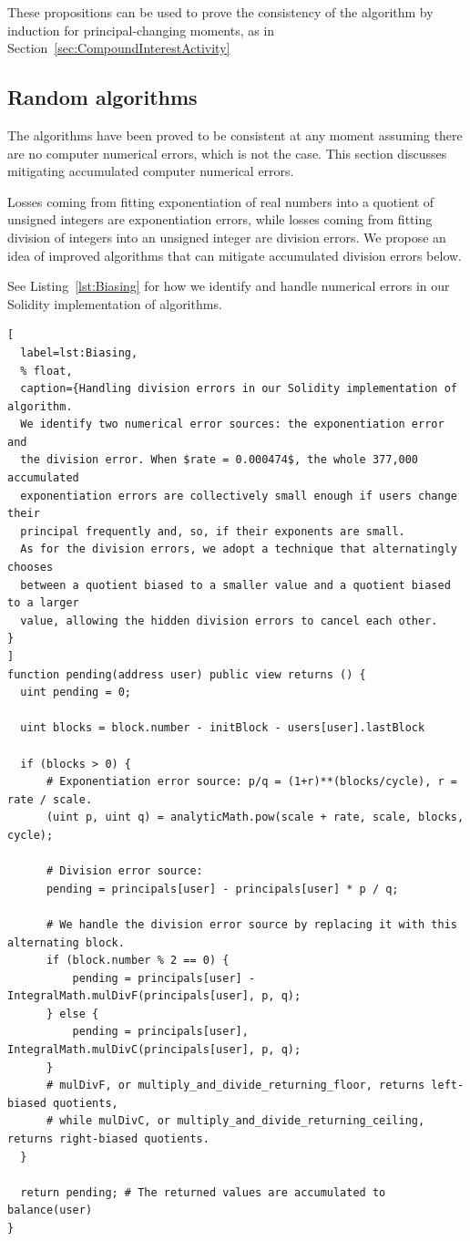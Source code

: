 \documentclass{article}
\begin{document}
These propositions can be used to prove the consistency of the algorithm by induction for 
principal-changing moments, as in Section~\ref{sec:CompoundInterestActivity}


\subsection{Random algorithms}
\label{sec:RandomAlgorithms}

The algorithms have been proved to be consistent at any moment assuming there are 
no computer numerical errors, which is not the case.
This section discusses mitigating accumulated computer numerical errors.

Losses coming from fitting exponentiation 
of real numbers into a quotient of unsigned integers are exponentiation errors, 
while losses coming from fitting division of integers into 
an unsigned integer are division errors.
We propose an idea of improved algorithms that can 
mitigate accumulated division errors below.

See Listing~\ref{lst:Biasing} for how we identify and handle numerical errors 
in our Solidity implementation of algorithms.
\newline

\begin{lstlisting}[
  label=lst:Biasing,
  % float,
  caption={Handling division errors in our Solidity implementation of algorithm. 
  We identify two numerical error sources: the exponentiation error and 
  the division error. When $rate = 0.000474$, the whole 377,000 accumulated 
  exponentiation errors are collectively small enough if users change their 
  principal frequently and, so, if their exponents are small.
  As for the division errors, we adopt a technique that alternatingly chooses 
  between a quotient biased to a smaller value and a quotient biased to a larger 
  value, allowing the hidden division errors to cancel each other.
}
]
function pending(address user) public view returns () { 
  uint pending = 0;
  
  uint blocks = block.number - initBlock - users[user].lastBlock
  
  if (blocks > 0) {
      # Exponentiation error source: p/q = (1+r)**(blocks/cycle), r = rate / scale.
      (uint p, uint q) = analyticMath.pow(scale + rate, scale, blocks, cycle);

      # Division error source:
      pending = principals[user] - principals[user] * p / q;

      # We handle the division error source by replacing it with this alternating block.
      if (block.number % 2 == 0) {
          pending = principals[user] - IntegralMath.mulDivF(principals[user], p, q);
      } else {
          pending = principals[user], IntegralMath.mulDivC(principals[user], p, q);
      }
      # mulDivF, or multiply_and_divide_returning_floor, returns left-biased quotients, 
      # while mulDivC, or multiply_and_divide_returning_ceiling, returns right-biased quotients.
  }

  return pending; # The returned values are accumulated to balance(user)
}
\end{lstlisting}
\end{document}
